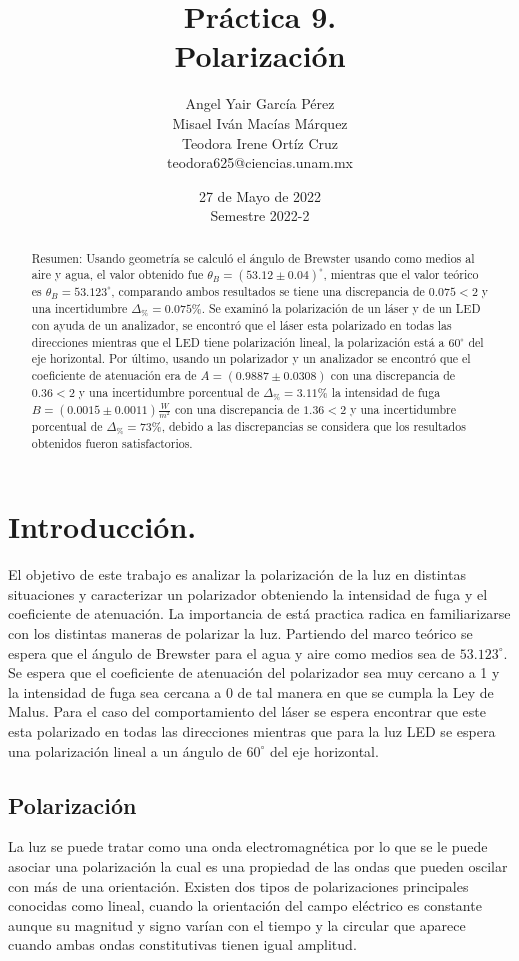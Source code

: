 \documentclass[DIV=calc, paper=a4, fontsize=10pt]{scrartcl}
\title{Práctica 9. \\ %
Polarización} %
\author{Angel Yair García Pérez \\
Misael Iván Macías Márquez\\
Teodora Irene Ortíz Cruz\\
\small{teodora625@ciencias.unam.mx}\\}
\date{27 de Mayo de 2022\\Semestre 2022-2}
\begin{document}
\maketitle
{}
\begin{abstract}

  \textcolor{carmine}{Resumen:} Usando geometría se calculó el ángulo de Brewster usando como medios al aire y agua, el valor obtenido fue $\theta_{B}= (53.12 \pm 0.04)^{\circ}$, mientras que el valor teórico es $\theta_{B} = 53.123^{\circ}$, comparando ambos resultados se tiene una discrepancia de $0.075<2$ y una incertidumbre $\Delta_{\%}=0.075\%$. Se examinó la polarización de un láser y de un LED con ayuda de un analizador, se encontró que el láser esta polarizado en todas las direcciones mientras que el LED tiene polarización lineal, la polarización está a $60^{\circ}$ del eje horizontal. Por último, usando un polarizador y un analizador se encontró que el coeficiente de atenuación era de $A= (0.9887 \pm 0.0308)$ con una discrepancia de $0.36<2$ y una incertidumbre porcentual de  $\Delta_{\%}=3.11\%$  la intensidad de fuga $B= (0.0015 \pm 0.0011) \frac{W}{m^{2}}$ con una discrepancia de $1.36<2$ y una incertidumbre porcentual de  $\Delta_{\%}=73\%$, debido a las discrepancias se considera que los resultados obtenidos fueron satisfactorios.
  
\end{abstract}
\section*{\textcolor{carmine}{Introducción.}}
El objetivo de este trabajo es analizar la polarización de la luz en distintas situaciones y caracterizar un polarizador\cite{Manual} obteniendo la intensidad de fuga y el coeficiente de atenuación. La importancia de está practica radica en familiarizarse con los distintas maneras de polarizar la luz. Partiendo del marco teórico se espera que el ángulo de Brewster para el agua y aire como medios sea de $53.123^{\circ}$. Se espera que el coeficiente de atenuación del polarizador sea muy cercano a 1 y la intensidad de fuga sea cercana a 0 de tal manera en que se cumpla la Ley de Malus. Para el caso del comportamiento del láser se espera encontrar que este esta polarizado en todas las direcciones mientras que para la luz LED se espera una polarización lineal a un ángulo de $60^{\circ}$ del eje horizontal. 
\subsection*{\textcolor{carmine}{Polarización}}
La luz se puede tratar como una onda electromagnética por lo que se le puede asociar una polarización la cual es una propiedad de las ondas que pueden oscilar con más de una orientación. Existen dos tipos de polarizaciones principales conocidas como lineal, cuando  la orientación del campo eléctrico es constante aunque su magnitud y signo varían con el tiempo y la circular que aparece cuando ambas ondas constitutivas tienen igual amplitud\cite{book}.
\end{document}
